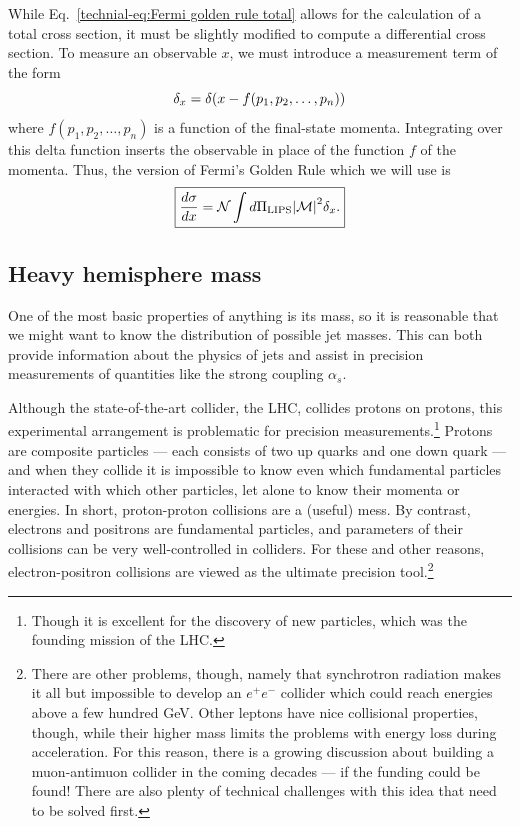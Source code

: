 \documentclass[../thesis.tex]{subfiles}
\providecommand{\LIPS}{\mathrm{LIPS}}
\providecommand{\cN}{\mathcal{N}}
\providecommand{\cM}{\mathcal{M}}
\begin{document}
	While Eq.~\ref{technial-eq:Fermi golden rule total} allows for the calculation of a total cross section, it must be slightly modified to compute a differential cross section. To measure an observable $x$, we must introduce a measurement term of the form
	\begin{equation}
		\delta_x = \delta\qty(x - f(p_1, p_2, \dots, p_n))
	\end{equation}
	where $f(p_1, p_2, \dots, p_n)$ is a function of the final-state momenta. Integrating over this delta function inserts the observable in place of the function $f$ of the momenta. Thus, the version of Fermi's Golden Rule which we will use is
	\begin{equation}\label{technical-eq:Fermi golden rule differential}
	\boxed{
		\frac{d\sigma}{dx} = \cN \int d\Pi_\LIPS \abs{\cM}^2 \delta_x.
	}
	\end{equation}

\subsection{Heavy hemisphere mass}
	One of the most basic properties of anything is its mass, so it is reasonable that we might want to know the distribution of possible jet masses. This can both provide information about the physics of jets and assist in precision measurements of quantities like the strong coupling $\alpha_s$.

	Although the state-of-the-art collider, the LHC, collides protons on protons, this experimental arrangement is problematic for precision measurements.\footnote{Though it is excellent for the discovery of new particles, which was the founding mission of the LHC.} Protons are composite particles --- each consists of two up quarks and one down quark --- and when they collide it is impossible to know even which fundamental particles interacted with which other particles, let alone to know their momenta or energies. In short, proton-proton collisions are a (useful) mess. By contrast, electrons and positrons are fundamental particles, and parameters of their collisions can be very well-controlled in colliders. For these and other reasons, electron-positron collisions are viewed as the ultimate precision tool.\footnote{There are other problems, though, namely that synchrotron radiation makes it all but impossible to develop an $e^+ e^-$ collider which could reach energies above a few hundred \si{\giga\electronvolt}. Other leptons have nice collisional properties, though, while their higher mass limits the problems with energy loss during acceleration. For this reason, there is a growing discussion about building a muon-antimuon collider in the coming decades --- if the funding could be found! There are also plenty of technical challenges with this idea that need to be solved first.}
\end{document}
